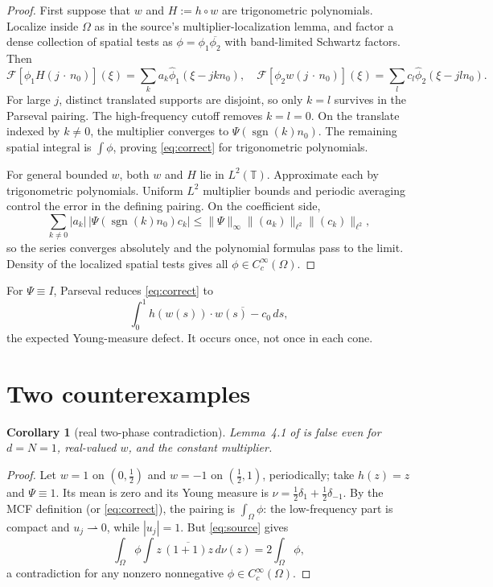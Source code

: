 \documentclass[11pt]{article}
\newtheorem{corollary}[theorem]{Corollary}
\newcommand{\T}{\mathbb T}
\newcommand{\F}{\mathcal F}
\begin{document}
\begin{proof}
First suppose that $w$ and $H:=h\circ w$ are trigonometric polynomials.
Localize inside $\Omega$ as in the source's multiplier-localization lemma,
and factor a dense collection of spatial tests as
$\phi=\phi_1\overline{\phi_2}$ with band-limited Schwartz factors.  Then
\[
 \F[\phi_1H(j\,\cdot\, n_0)](\xi)
 =\sum_k a_k\widehat\phi_1(\xi-jk n_0),\quad
 \F[\phi_2w(j\,\cdot\, n_0)](\xi)
 =\sum_l c_l\widehat\phi_2(\xi-jl n_0).
\]
For large $j$, distinct translated supports are disjoint, so only $k=l$
survives in the Parseval pairing.  The high-frequency cutoff removes
$k=l=0$.  On the translate indexed by $k\ne0$, the multiplier converges to
$\Psi(\operatorname{sgn}(k)n_0)$.  The remaining spatial integral is
$\int\phi$, proving \eqref{eq:correct} for trigonometric polynomials.

For general bounded $w$, both $w$ and $H$ lie in $L^2(\T)$.  Approximate each
by trigonometric polynomials.  Uniform $L^2$ multiplier bounds and periodic
averaging control the error in the defining pairing.  On the coefficient
side,
\[
 \sum_{k\ne0}|a_k|\,|\Psi(\operatorname{sgn}(k)n_0)c_k|
 \le \|\Psi\|_\infty\|(a_k)\|_{\ell^2}\|(c_k)\|_{\ell^2},
\]
so the series converges absolutely and the polynomial formulas pass to the
limit.  Density of the localized spatial tests gives all
$\phi\in C_c^\infty(\Omega)$.
\end{proof}

For $\Psi\equiv I$, Parseval reduces \eqref{eq:correct} to
\[
 \int_0^1h(w(s))\cdot\overline{w(s)-c_0}\,ds,
\]
the expected Young-measure defect.  It occurs once, not once in each cone.

\section{Two counterexamples}

\begin{corollary}[real two-phase contradiction]\label{cor:real}
Lemma~4.1 of \cite{Rindler} is false even for $d=N=1$, real-valued $w$, and
the constant multiplier.
\end{corollary}

\begin{proof}
Let $w=1$ on $(0,\tfrac12)$ and $w=-1$ on $(\tfrac12,1)$, periodically;
take $h(z)=z$ and $\Psi\equiv1$.  Its mean is zero and its Young measure is
$\nu=\tfrac12\delta_1+\tfrac12\delta_{-1}$.  By the MCF definition (or
\eqref{eq:correct}), the pairing is $\int_\Omega\phi$: the low-frequency
part is compact and $u_j\rightharpoonup0$, while $|u_j|=1$.  But
\eqref{eq:source} gives
\[
 \int_\Omega\phi\int z\,\overline{(1+1)z}\,d\nu(z)
 =2\int_\Omega\phi,
\]
a contradiction for any nonzero nonnegative $\phi\in C_c^\infty(\Omega)$.
\end{proof}
\end{document}
